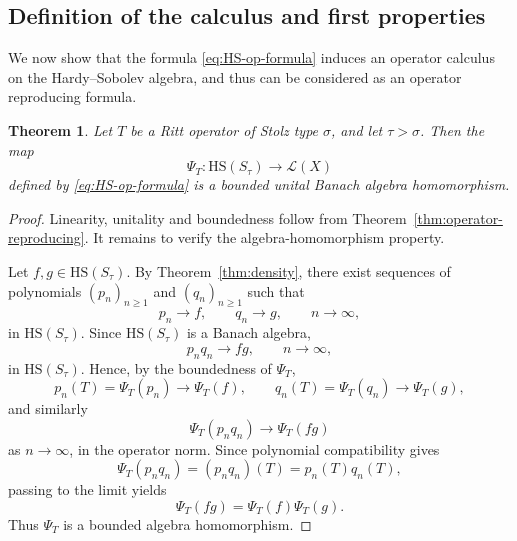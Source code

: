 \documentclass[11pt]{amsart}
\numberwithin{equation}{section}
\newtheorem{theorem}{Theorem}[section]
\newtheorem{remark}[theorem]{Remark}
\theoremstyle{definition}
\theoremstyle{plain}
\def\L{L}
\newcommand{\HS}{\mathrm{HS}}
\renewcommand{\L}{\mathcal L}
\begin{document}

\subsection{Definition of the calculus and first properties}

We now show that the formula \eqref{eq:HS-op-formula} induces an operator calculus on the 
Hardy--Sobolev algebra, and thus can be considered as an operator reproducing formula.

\begin{theorem}\label{thm:HS-calc-Ritt}
Let \(T\) be a Ritt operator of Stolz type \(\sigma\), and let
\(\tau>\sigma\).  Then the map
\[
        \Psi_T:\HS(S_\tau)\longrightarrow\L(X)
\]
defined by \eqref{eq:HS-op-formula} is a bounded unital Banach algebra
homomorphism.  
\end{theorem}

\begin{proof}
Linearity, unitality and boundedness follow from
Theorem~\ref{thm:operator-reproducing}. 
 It remains to verify the
algebra-homomorphism property.

Let \(f,g\in\HS(S_\tau)\).  By Theorem~\ref{thm:density}, there exist
sequences of polynomials \((p_n)_{n\ge 1}\) and \((q_n)_{n \ge 1}\) such that
\[
        p_n\to f,
        \qquad
        q_n\to g,
        \qquad n\to\infty,
\]
in \(\HS(S_\tau)\).  Since \(\HS(S_\tau)\) is a Banach algebra,
\[
        p_nq_n\to fg,
        \qquad n\to\infty,
\]
in \(\HS(S_\tau)\). %
Hence, by the boundedness of $\Psi_T$,  
\[
        p_n(T)=\Psi_T(p_n)\to \Psi_T(f),
        \qquad
        q_n(T)=\Psi_T(q_n)\to \Psi_T(g),
\]
and similarly
\[
        \Psi_T(p_nq_n)\to \Psi_T(fg)
\]
as $n \to \infty$, in the operator norm.  Since polynomial compatibility gives
\[
        \Psi_T(p_nq_n)=(p_nq_n)(T)=p_n(T)q_n(T),
\]
passing to the limit yields 
\[
        \Psi_T(fg)=\Psi_T(f)\Psi_T(g).
\]
Thus \(\Psi_T\) is a bounded algebra homomorphism.
\end{proof}
\end{document}
